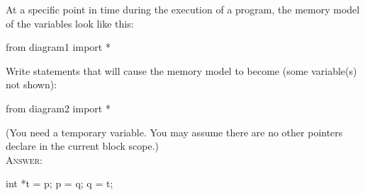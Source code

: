 

\renewcommand\AUTHOR{cadalebout1@cougars.ccis.edu} %


\topmattertwo

\nextq
At a specific point in time during the execution of 
a program, the memory model of the variables look like this: 
\begin{python}
from diagram1 import *
\end{python}
Write statements that will cause the memory model to become
(some variable(s) not shown):
\begin{python}
from diagram2 import *
\end{python}
(You need a temporary variable. You may assume there are no other
pointers declare in the current block scope.)
\\
\textsc{Answer:}\vspace{-2mm}
\begin{answercode}
int *t = p;
p = q;
q = t;
\end{answercode}

\newpage



